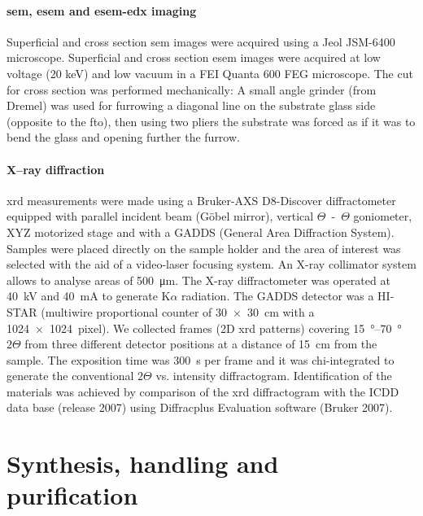 	\paragraph{\Gls{sem}, \gls{esem} and \gls{esem}-\gls{edx} imaging} Superficial and cross section \gls{sem} images were acquired using a Jeol JSM-6400 microscope. Superficial and cross section \gls{esem} images were acquired at low voltage (20 keV) and low vacuum in a FEI Quanta 600 FEG microscope. The cut for cross section was performed mechanically: A small angle grinder (from Dremel) was used for furrowing a diagonal line on the substrate glass side (opposite to the \gls{fto}), then using two pliers the substrate was forced as if it was to bend the glass and opening further the furrow.
	
	\paragraph{X--ray diffraction} \gls{xrd} measurements were made using a Bruker-AXS D8-Discover diffractometer equipped with parallel incident beam (Göbel mirror), vertical $\Theta$~-~$\Theta$ goniometer, XYZ motorized stage and with a GADDS (General Area Diffraction System). Samples were placed directly on the sample holder and the area of interest was selected with the aid of a video-laser focusing  system. An X-ray collimator system allows to analyse areas of \SI{500}{\um}. The X-ray diffractometer was operated at \SI{40}{\kV} and \SI{40}{\mA} to generate  K$\alpha$ radiation. The GADDS detector was a HI-STAR (multiwire proportional counter of \SI{30x30}{\cm} with a \SI{1024x1024}{pixel}). We collected frames (2D \gls{xrd} patterns) covering \SIrange{15}{70}{\degree} $2\Theta$ from three different detector positions at a distance of \SI{15}{\cm} from the sample. The exposition time was \SI{300}{\s} per frame and it was chi-integrated to generate the conventional $2\Theta$ vs. intensity diffractogram. Identification of the materials was achieved by comparison of the \gls{xrd} diffractogram with the ICDD data base (release 2007) using Diffracplus Evaluation software (Bruker 2007).


\section{Synthesis, handling and purification}

